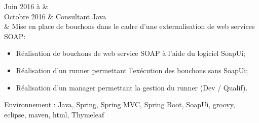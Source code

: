 Juin 2016 à    & \\%
Octobre 2016   & Consultant Java \\%
			   & Mise en place de bouchons dans le cadre d'une externalisation de web services SOAP:%
			   \begin{itemize}%
			   		\item Réalisation de bouchons de web service SOAP à l'aide du logiciel SoapUi;%
			   		\item Réalisation d'un runner permettant l'exécution des bouchons sans SoapUi;%
			   		\item Réalisation d'un manager permettant la gestion du runner (Dev / Qualif).
			   \end{itemize}%
Environnement : Java, Spring, Spring MVC, Spring Boot, SoapUi, groovy, eclipse, maven, html, Thymeleaf \\\\
